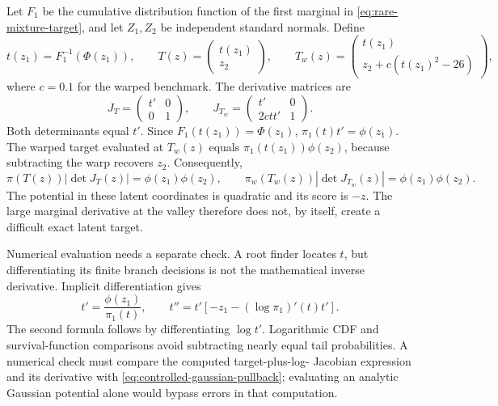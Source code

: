 Let $F_1$ be the cumulative distribution function of the first marginal in
\eqref{eq:rare-mixture-target}, and let $Z_1,Z_2$ be independent standard
normals. Define
\begin{equation}
 t(z_1)=F_1^{-1}(\Phi(z_1)),\qquad
 T(z)=\begin{pmatrix}t(z_1)\\z_2\end{pmatrix},\qquad
 T_w(z)=\begin{pmatrix}t(z_1)\\z_2+c(t(z_1)^2-26)\end{pmatrix},
 \label{eq:controlled-exact-transports}
\end{equation}
where $c=0.1$ for the warped benchmark. The derivative matrices are
\begin{equation}
 J_T=\begin{pmatrix}t'&0\\0&1\end{pmatrix},\qquad
 J_{T_w}=\begin{pmatrix}t'&0\\2ctt'&1\end{pmatrix}.
\end{equation}
Both determinants equal $t'$. Since $F_1(t(z_1))=\Phi(z_1)$,
$\pi_1(t)t'=\phi(z_1)$. The warped target evaluated at $T_w(z)$ equals
$\pi_1(t(z_1))\phi(z_2)$, because subtracting the warp recovers $z_2$.
Consequently,
\begin{equation}
 \pi(T(z))|\det J_T(z)|=\phi(z_1)\phi(z_2),\qquad
 \pi_w(T_w(z))|\det J_{T_w}(z)|=\phi(z_1)\phi(z_2).
 \label{eq:controlled-gaussian-pullback}
\end{equation}
The potential in these latent coordinates is quadratic and its score is $-z$.
The large marginal derivative at the valley therefore does not, by itself,
create a difficult exact latent target.

Numerical evaluation needs a separate check. A root finder locates $t$, but
differentiating its finite branch decisions is not the mathematical inverse
derivative. Implicit differentiation gives
\begin{equation}
 t'=\frac{\phi(z_1)}{\pi_1(t)},\qquad
 t''=t'\left[-z_1-(\log\pi_1)'(t)t'\right].
 \label{eq:controlled-inverse-derivatives}
\end{equation}
The second formula follows by differentiating $\log t'$. Logarithmic CDF and
survival-function comparisons avoid subtracting nearly equal tail
probabilities. A numerical check must compare the computed target-plus-log-
Jacobian expression and its derivative with
\eqref{eq:controlled-gaussian-pullback}; evaluating an analytic Gaussian
potential alone would bypass errors in that computation.

